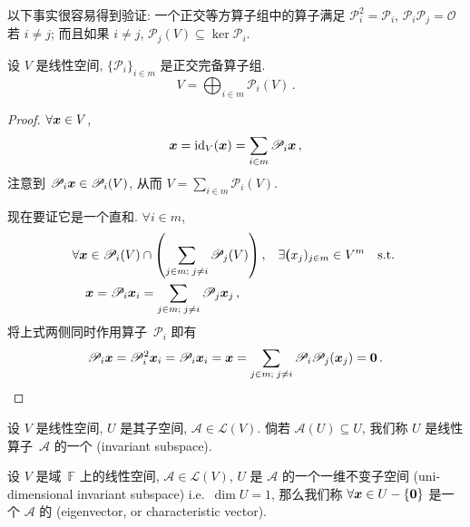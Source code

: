 \documentclass[openany, a5paper, oneside]{ctexbook}
\begin{document}
以下事实很容易得到验证:
一个正交等方算子组中的算子满足 $\mathscr P_i^2 = \mathscr P_i$, 
$\mathscr P_i \mathscr P_j = \mathscr O$ 若 $i \neq j$; 
而且如果 $i \neq j$, $\mathscr P_j(V) \subseteq \ker \mathscr P_i$.


\begin{theorem}[线性空间用正交完备算子组的像直和分解]
	设 $V$ 是线性空间, $\{\mathscr P_i\}_{i \in m}$ 是正交完备算子组.
	\begin{equation*}
		V = \bigoplus_{i \in m} \mathscr P_i(V)\,.
	\end{equation*}
\end{theorem}
\begin{proof}
	$\forall \boldsymbol{x} \in V$, 
	\begin{equation*}
		\boldsymbol{x} = \operatorname{id}_V(\boldsymbol{x}) = \sum_{i \in m} \mathscr P_i \boldsymbol{x}\,,
	\end{equation*}
	注意到 $\mathscr P_i \boldsymbol{x} \in \mathscr P_i(V)$, 从而 $V = \sum_{i \in m} \mathscr P_i(V)$.

	现在要证它是一个直和. 
	$\forall i \in m$, 
	\begin{align*}
		\forall \boldsymbol{x} \in \mathscr P_i(V) &\cap \left( \sum_{j \in m;\; j \neq i} \mathscr P_j(V)\right), 
		&
		\exists \boldsymbol{(}x_j)_{j \in m} &\in V^m  
		&
		&\text{s.t.\ }
		\\
		\boldsymbol{x} = \mathscr P_i \boldsymbol{x}_i &= \sum_{j \in m;\; j \neq i} \mathscr P_j \boldsymbol{x}_j\,,
		& &
		& &
	\end{align*}
	将上式两侧同时作用算子~$\mathscr P_i$ 即有
	\begin{equation*}
		\mathscr P_i \boldsymbol{x} = \mathscr P_i^2 \boldsymbol{x}_i = \mathscr P_i \boldsymbol{x}_i = \boldsymbol{x} = 
		\sum_{j \in m;\; j \neq i} \mathscr P_i \mathscr P_j (\boldsymbol{x}_j) = \boldsymbol{0}\,.
	\end{equation*}
\end{proof}

\begin{definition}[不变子空间]
	设 $V$ 是线性空间, $U$ 是其子空间, $\mathscr A \in \mathcal L(V)$. 倘若 $\mathscr A(U) \subseteq U$, 我们称 $U$ 是线性算子~$\mathscr A$ 的一个 (invariant subspace).
\end{definition}

\begin{definition}[特征向量]
	设 $V$ 是域~$\mathbb F$ 上的线性空间, $\mathscr A \in \mathcal L(V)$, $U$ 是 $\mathscr A$ 的一个一维不变子空间 (uni-dimensional invariant subspace) i.e.\ $\dim U = 1$, 那么我们称 $\forall \boldsymbol{x} \in U - \{\boldsymbol{0}\}$ 是一个 $\mathscr A$ 的 (eigenvector, or characteristic vector).
\end{definition}
\end{document}
